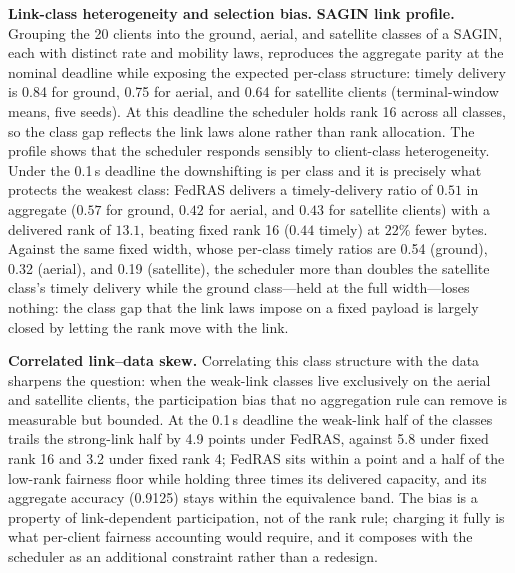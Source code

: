 \documentclass[a4paper,fleqn]{cas-dc}
\begin{document}
\textbf{Link-class heterogeneity and selection bias.} \textbf{SAGIN link profile.} Grouping the 20 clients into the ground, aerial, and satellite classes of a SAGIN, each with distinct rate and mobility laws, reproduces the aggregate parity at the nominal deadline while exposing the expected per-class structure: timely delivery is 0.84 for ground, 0.75 for aerial, and 0.64 for satellite clients (terminal-window means, five seeds). At this deadline the scheduler holds rank 16 across all classes, so the class gap reflects the link laws alone rather than rank allocation. The profile shows that the scheduler responds sensibly to client-class heterogeneity. Under the 0.1\,s deadline the downshifting is per class and it is precisely what protects the weakest class: FedRAS delivers a timely-delivery ratio of $0.51$ in aggregate ($0.57$ for ground, $0.42$ for aerial, and $0.43$ for satellite clients) with a delivered rank of $13.1$, beating fixed rank 16 ($0.44$ timely) at $22\%$ fewer bytes. Against the same fixed width, whose per-class timely ratios are 0.54 (ground), 0.32 (aerial), and 0.19 (satellite), the scheduler more than doubles the satellite class's timely delivery while the ground class---held at the full width---loses nothing: the class gap that the link laws impose on a fixed payload is largely closed by letting the rank move with the link.
\par
\textbf{Correlated link--data skew.} Correlating this class structure with the data sharpens the question: when the weak-link classes live exclusively on the aerial and satellite clients, the participation bias that no aggregation rule can remove is measurable but bounded. At the 0.1\,s deadline the weak-link half of the classes trails the strong-link half by 4.9 points under FedRAS, against 5.8 under fixed rank 16 and 3.2 under fixed rank 4; FedRAS sits within a point and a half of the low-rank fairness floor while holding three times its delivered capacity, and its aggregate accuracy (0.9125) stays within the equivalence band. The bias is a property of link-dependent participation, not of the rank rule; charging it fully is what per-client fairness accounting would require, and it composes with the scheduler as an additional constraint rather than a redesign.
\par
\end{document}
